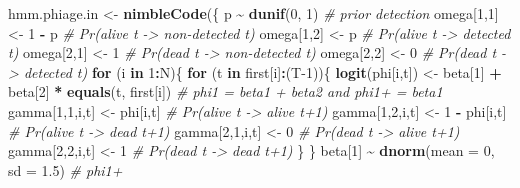 \documentclass[
  12pt,
]{krantz}
\newenvironment{Shaded}{\begin{snugshade}}{\end{snugshade}}
\newcommand{\AttributeTok}[1]{\textcolor[rgb]{0.13,0.29,0.53}{#1}}
\newcommand{\CommentTok}[1]{\textcolor[rgb]{0.56,0.35,0.01}{\textit{#1}}}
\newcommand{\ControlFlowTok}[1]{\textcolor[rgb]{0.13,0.29,0.53}{\textbf{#1}}}
\newcommand{\DecValTok}[1]{\textcolor[rgb]{0.00,0.00,0.81}{#1}}
\newcommand{\FloatTok}[1]{\textcolor[rgb]{0.00,0.00,0.81}{#1}}
\newcommand{\FunctionTok}[1]{\textcolor[rgb]{0.13,0.29,0.53}{\textbf{#1}}}
\newcommand{\NormalTok}[1]{#1}
\newcommand{\OtherTok}[1]{\textcolor[rgb]{0.56,0.35,0.01}{#1}}
\newcommand{\SpecialCharTok}[1]{\textcolor[rgb]{0.81,0.36,0.00}{\textbf{#1}}}
\begin{document}
\begin{Shaded}
\begin{Highlighting}[]
\NormalTok{hmm.phiage.in }\OtherTok{\textless{}{-}} \FunctionTok{nimbleCode}\NormalTok{(\{}
\NormalTok{  p }\SpecialCharTok{\textasciitilde{}} \FunctionTok{dunif}\NormalTok{(}\DecValTok{0}\NormalTok{, }\DecValTok{1}\NormalTok{) }\CommentTok{\# prior detection}
\NormalTok{  omega[}\DecValTok{1}\NormalTok{,}\DecValTok{1}\NormalTok{] }\OtherTok{\textless{}{-}} \DecValTok{1} \SpecialCharTok{{-}}\NormalTok{ p    }\CommentTok{\# Pr(alive t {-}\textgreater{} non{-}detected t)}
\NormalTok{  omega[}\DecValTok{1}\NormalTok{,}\DecValTok{2}\NormalTok{] }\OtherTok{\textless{}{-}}\NormalTok{ p        }\CommentTok{\# Pr(alive t {-}\textgreater{} detected t)}
\NormalTok{  omega[}\DecValTok{2}\NormalTok{,}\DecValTok{1}\NormalTok{] }\OtherTok{\textless{}{-}} \DecValTok{1}        \CommentTok{\# Pr(dead t {-}\textgreater{} non{-}detected t)}
\NormalTok{  omega[}\DecValTok{2}\NormalTok{,}\DecValTok{2}\NormalTok{] }\OtherTok{\textless{}{-}} \DecValTok{0}        \CommentTok{\# Pr(dead t {-}\textgreater{} detected t)}
  \ControlFlowTok{for}\NormalTok{ (i }\ControlFlowTok{in} \DecValTok{1}\SpecialCharTok{:}\NormalTok{N)\{}
    \ControlFlowTok{for}\NormalTok{ (t }\ControlFlowTok{in}\NormalTok{ first[i]}\SpecialCharTok{:}\NormalTok{(T}\DecValTok{{-}1}\NormalTok{))\{}
    \FunctionTok{logit}\NormalTok{(phi[i,t]) }\OtherTok{\textless{}{-}}\NormalTok{ beta[}\DecValTok{1}\NormalTok{] }\SpecialCharTok{+}\NormalTok{ beta[}\DecValTok{2}\NormalTok{] }\SpecialCharTok{*} \FunctionTok{equals}\NormalTok{(t, first[i]) }\CommentTok{\# phi1 = beta1 + beta2 and phi1+ = beta1}
\NormalTok{    gamma[}\DecValTok{1}\NormalTok{,}\DecValTok{1}\NormalTok{,i,t] }\OtherTok{\textless{}{-}}\NormalTok{ phi[i,t]      }\CommentTok{\# Pr(alive t {-}\textgreater{} alive t+1)}
\NormalTok{    gamma[}\DecValTok{1}\NormalTok{,}\DecValTok{2}\NormalTok{,i,t] }\OtherTok{\textless{}{-}} \DecValTok{1} \SpecialCharTok{{-}}\NormalTok{ phi[i,t]  }\CommentTok{\# Pr(alive t {-}\textgreater{} dead t+1)}
\NormalTok{    gamma[}\DecValTok{2}\NormalTok{,}\DecValTok{1}\NormalTok{,i,t] }\OtherTok{\textless{}{-}} \DecValTok{0}           \CommentTok{\# Pr(dead t {-}\textgreater{} alive t+1)}
\NormalTok{    gamma[}\DecValTok{2}\NormalTok{,}\DecValTok{2}\NormalTok{,i,t] }\OtherTok{\textless{}{-}} \DecValTok{1}           \CommentTok{\# Pr(dead t {-}\textgreater{} dead t+1)}
\NormalTok{    \}}
\NormalTok{  \}}
\NormalTok{  beta[}\DecValTok{1}\NormalTok{] }\SpecialCharTok{\textasciitilde{}} \FunctionTok{dnorm}\NormalTok{(}\AttributeTok{mean =} \DecValTok{0}\NormalTok{, }\AttributeTok{sd =} \FloatTok{1.5}\NormalTok{) }\CommentTok{\# phi1+}

\end{Highlighting}
\end{Shaded}
\end{document}
